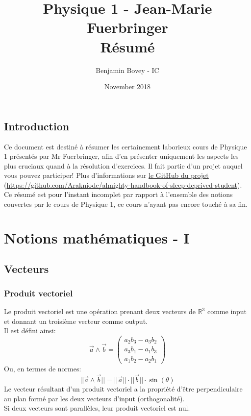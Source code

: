 \documentclass{article}
\title{\vspace{-1.5cm} Physique 1 - Jean-Marie Fuerbringer \\ Résumé}
\author{Benjamin Bovey - IC}
\date{November 2018}
\numberwithin{equation}{section}
\begin{document}
\maketitle

\subsection*{Introduction}
Ce document est destiné à résumer les certainement laborieux cours de Physique 1 présentés par Mr Fuerbringer, afin d'en présenter uniquement les aspects les plus cruciaux quand à la résolution d'exercices. Il fait partie d'un projet auquel vous pouvez participer! Plus d'informations sur \href{https://github.com/Arakniode/almighty-handbook-of-sleep-deprived-student}{le GitHub du projet} (\url{https://github.com/Arakniode/almighty-handbook-of-sleep-deprived-student}). \\
Ce résumé est pour l'instant incomplet par rapport à l'ensemble des notions couvertes par le cours de Physique 1, ce cours n'ayant pas encore touché à sa fin. 

\section{Notions mathématiques - I}

\subsection{Vecteurs}

\subsubsection{Produit vectoriel}

Le produit vectoriel est une opération prenant deux vecteurs de \(\mathbb{R}^3\) comme input et donnant un troisième vecteur comme output. \\ %
Il est défini ainsi:
\begin{equation}
	\boxed {\vec a \wedge \vec b = \begin{pmatrix}a_2b_3 - a_3b_2 \\ a_3b_1 - a_1b_3 \\ a_1b_2 - a_2b_1\end{pmatrix} }
\end{equation}
Ou, en termes de normes:
\begin{equation}
	\boxed{ ||\vec a \wedge \vec b|| = ||\vec a|| \cdot ||\vec b|| \cdot \sin(\theta) }
\end{equation}
Le vecteur résultant d'un produit vectoriel a la propriété d'être perpendiculaire au plan formé par les deux vecteurs d'input (orthogonalité).\\
Si deux vecteurs sont parallèles, leur produit vectoriel est nul. \\
\end{document}
